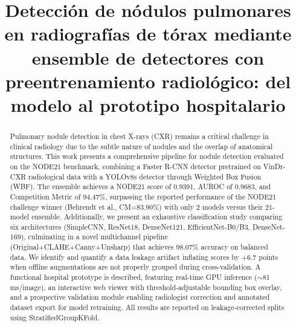\documentclass[conference]{IEEEtran}
\begin{document}
\title{Detección de nódulos pulmonares en radiografías de tórax mediante ensemble de detectores con preentrenamiento radiológico: del modelo al prototipo hospitalario}

\author{
}

\maketitle

\begin{abstract}
Pulmonary nodule detection in chest X-rays (CXR) remains a critical challenge in clinical radiology due to the subtle nature of nodules and the overlap of anatomical structures. This work presents a comprehensive pipeline for nodule detection evaluated on the NODE21 benchmark, combining a Faster R-CNN detector pretrained on VinDr-CXR radiological data with a YOLOv8s detector through Weighted Box Fusion (WBF). The ensemble achieves a NODE21 score of 0.9391, AUROC of 0.9683, and Competition Metric of 94.47\%, surpassing the reported performance of the NODE21 challenge winner (Behrendt et al., CM=83.90\%) with only 2 models versus their 21-model ensemble. Additionally, we present an exhaustive classification study comparing six architectures (SimpleCNN, ResNet18, DenseNet121, EfficientNet-B0/B3, DenseNet-169), culminating in a novel multichannel pipeline (Original+CLAHE+Canny+Unsharp) that achieves 98.07\% accuracy on balanced data. We identify and quantify a data leakage artifact inflating scores by +6.7 points when offline augmentations are not properly grouped during cross-validation. A functional hospital prototype is described, featuring real-time GPU inference ($\sim$81\,ms/image), an interactive web viewer with threshold-adjustable bounding box overlay, and a prospective validation module enabling radiologist correction and annotated dataset export for model retraining. All results are reported on leakage-corrected splits using StratifiedGroupKFold.
\end{abstract}
\end{document}
